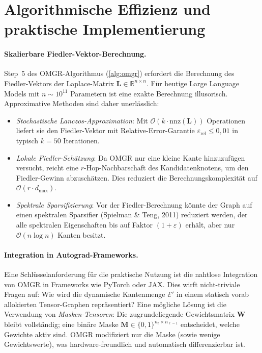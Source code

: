 \documentclass[12pt, a4paper, openany]{report}
\newcommand{\R}{\mathbb{R}}
\newcommand{\calE}{\mathcal{E}}
\newcommand{\eps}{\varepsilon}
\begin{document}
\section{Algorithmische Effizienz und praktische Implementierung}
\label{sec:outlook_algo}

\paragraph{Skalierbare Fiedler-Vektor-Berechnung.}
Step~5 des OMGR-Algorithmus (\cref{alg:omgr}) erfordert die Berechnung
des Fiedler-Vektors der Laplace-Matrix $\bm{L} \in \R^{n \times n}$.
Für heutige Large Language Models mit $n \sim 10^{11}$ Parametern ist
eine exakte Berechnung illusorisch.  Approximative Methoden sind
daher unerlässlich:
\begin{itemize}
  \item \emph{Stochastische Lanczos-Approximation}: Mit $\mathcal{O}(k \cdot \mathrm{nnz}(\bm{L}))$
    Operationen liefert sie den Fiedler-Vektor mit Relative-Error-Garantie
    $\eps_{\mathrm{rel}} \leq 0{,}01$ in typisch $k = 50$ Iterationen.
  \item \emph{Lokale Fiedler-Schätzung}: Da OMGR nur eine kleine Kante
    hinzuzufügen versucht, reicht eine $r$-Hop-Nachbarschaft des
    Kandidatenknotens, um den Fiedler-Gewinn abzuschätzen.  Dies reduziert
    die Berechnungskomplexität auf $\mathcal{O}(r \cdot d_{\max})$.
  \item \emph{Spektrale Sparsifizierung}: Vor der Fiedler-Berechnung
    könnte der Graph auf einen spektralen Sparsifier (Spielman \& Teng, 2011)
    reduziert werden, der alle spektralen Eigenschaften bis auf Faktor
    $(1+\eps)$ erhält, aber nur $\mathcal{O}(n \log n)$ Kanten besitzt.
\end{itemize}

\paragraph{Integration in Autograd-Frameworks.}
Eine Schlüsselanforderung für die praktische Nutzung ist die nahtlose
Integration von OMGR in Frameworks wie PyTorch oder JAX.  Dies wirft
nicht-triviale Fragen auf: Wie wird die dynamische Kantenmenge $\calE'$
in einem statisch vorab allokierten Tensor-Graphen repräsentiert?
Eine mögliche Lösung ist die Verwendung von \emph{Masken-Tensoren}: Die
zugrundeliegende Gewichtsmatrix $\bm{W}$ bleibt vollständig; eine binäre
Maske $\bm{M} \in \{0,1\}^{n_\ell \times n_{\ell-1}}$ entscheidet, welche
Gewichte aktiv sind.  OMGR modifiziert nur die Maske (sowie wenige
Gewichtswerte), was hardware-freundlich und automatisch differenzierbar ist.
\end{document}
